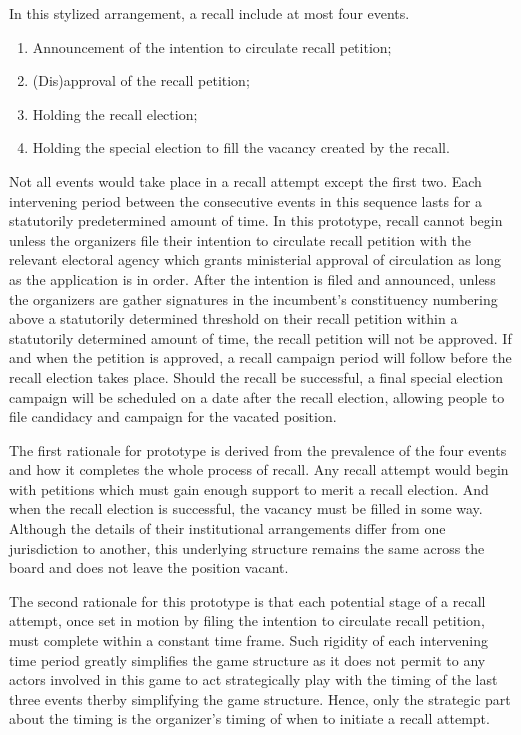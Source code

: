 \documentclass[hyphens, crop=false]{standalone}
\begin{document}
		In this stylized arrangement, a recall include at most four events.
		\begin{enumerate}
			\item 
			Announcement of the intention to circulate recall petition;
			\item 
			(Dis)approval of the recall petition;
			\item 
			Holding the recall election;
			\item
			Holding the special election to fill the vacancy created by the recall.
		\end{enumerate}
		Not all events would take place in a recall attempt except the first two.
		Each intervening period between the consecutive events in this sequence
		lasts for a statutorily predetermined amount of time.
		In this prototype,
		recall cannot begin unless the organizers file their intention to circulate recall petition
		with the relevant electoral agency
		which grants ministerial approval of circulation as long as the application is in order.
		After the intention is filed and announced,
		unless
		the organizers are gather signatures in the incumbent's constituency
		numbering above a statutorily determined threshold on their recall petition
		within a statutorily determined amount of time,
		the recall petition will not be approved.
		If and when the petition is approved,
		a recall campaign period will follow before the recall election takes place.
		Should the recall be successful,
		a final special election campaign will be scheduled on a date after the recall election,
		allowing people to file candidacy and campaign for the vacated position.
		
		The first rationale for prototype is derived from the prevalence
		of the four events and how it completes the whole process of recall.
		Any recall attempt would begin with petitions which must gain enough support to merit a recall election.
		And when the recall election is successful, the vacancy must be filled in some way.
		Although the details of their institutional arrangements differ from one jurisdiction to another,
		this underlying structure remains the same across the board and does not leave the position vacant.
		
		The second rationale for this prototype
		is that each potential stage of a recall attempt,
		once set in motion by filing the intention to circulate recall petition,
		must complete within a constant time frame.
		Such rigidity of each intervening time period greatly simplifies the game structure
		as
		it does not permit to any actors involved in this game to
		act strategically play with the timing of the last three events
		therby simplifying the game structure.
		Hence, only the strategic part about the timing is the organizer's timing of when to initiate a recall attempt.
		
\end{document}
